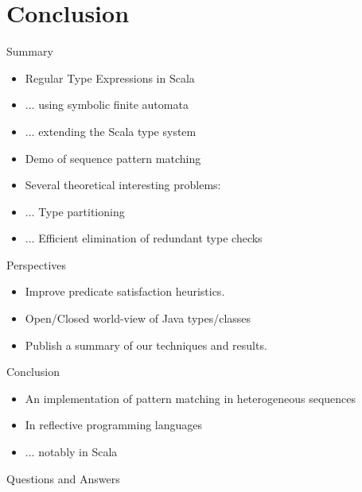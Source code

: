 \section{Conclusion}

{  %
\begin{frame}{Summary}
  \begin{itemize}
  \item Regular Type Expressions in Scala
  \item ... using symbolic finite automata
  \item ... extending the Scala type system
  \item Demo of sequence pattern matching
  \item Several theoretical interesting problems:
  \item ... Type partitioning
  \item ... Efficient elimination of redundant type checks
  \end{itemize}
\end{frame}
}

\begin{frame}{Perspectives}
  \begin{itemize}
  \item Improve predicate satisfaction heuristics.
  \item Open/Closed world-view of Java types/classes
  \item Publish a summary of our techniques and results.
  \end{itemize}
\end{frame}

\begin{frame}{Conclusion}
  \begin{itemize}
  \item An implementation of pattern matching in heterogeneous sequences
  \item In reflective programming languages
  \item ... notably in Scala
  \end{itemize}
\end{frame}

\begin{frame}{Questions and Answers}
\end{frame}
